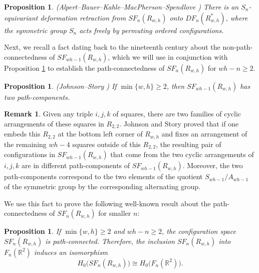 \documentclass[pagebackref,colorlinks,citecolor=blue,linkcolor=blue,urlcolor=blue,filecolor=blue]{article}
\newtheorem{prop}[thm]{Proposition}
\theoremstyle{definition}\newtheorem{definition}[thm]{Definition}
\theoremstyle{definition}
\newtheorem{remark}[thm]{Remark}
\newcommand{\R}{\ensuremath{\mathbb{R}}}
\begin{document}
\begin{prop}\label{square is cube}
(Alpert--Bauer--Kahle--MacPherson--Spendlove \cite[Theorem 3.5]{alpert2023homology})
There is an $S_{n}$-equivariant deformation retraction from $SF_{n}(R_{w,h})$ onto $DF_{n}(R^{*}_{w,h})$, where the symmetric group $S_n$ acts freely by permuting ordered configurations.
\end{prop}

Next, we recall a fact dating back to the nineteenth century about the non-path-connectedness of $SF_{wh-1}(R_{w,h})$, which we will use in conjunction with Proposition \ref{square is cube} to establish the path-connectedness of $SF_{n}(R_{w,h})$ for $wh-n\ge 2$.

\begin{prop}\label{15 puzzle has two components}
(Johnson--Story \cite{johnson1879notes})
If $\min\{w,h\}\ge 2$, then $SF_{wh-1}(R_{w,h})$ has two path-components.
\end{prop}

\begin{remark}\label{two components}
Given any triple $i,j, k$ of squares, there are two families of cyclic arrangements of these squares in $R_{2,2}$.
Johnson and Story proved that if one embeds this $R_{2,2}$ at the bottom left corner of $R_{w,h}$ and fixes an arrangement of the remaining $wh-4$ squares outside of this $R_{2,2}$, the resulting pair of configurations in $SF_{wh-1}(R_{w,h})$ that come from the two cyclic arrangements of $i,j,k$ are in different path-components of $SF_{wh-1}(R_{w,h})$.
Moreover, the two path-components correspond to the two elements of the quotient $S_{wh-1}/A_{wh-1}$ of the symmetric group by the corresponding alternating group.
\end{remark} 

We use this fact to prove the following well-known result about the path-connectedness of $SF_{n}(R_{w,h})$ for smaller $n$:

\begin{prop}\label{n le wh-2 is connected}
If $\min\{w, h\}\ge 2$ and $wh-n\ge 2$, the configuration space $SF_{n}(R_{w,h})$ is path-connected.
Therefore, the inclusion $SF_{n}(R_{w,h})$ into $F_{n}(\R^{2})$ induces an isomorphism
\[
H_{0}\big(SF_{n}(R_{w,h})\big)\cong H_{0}\big( F_{n}(\R^{2})\big).
\]
\end{prop}
\end{document}
